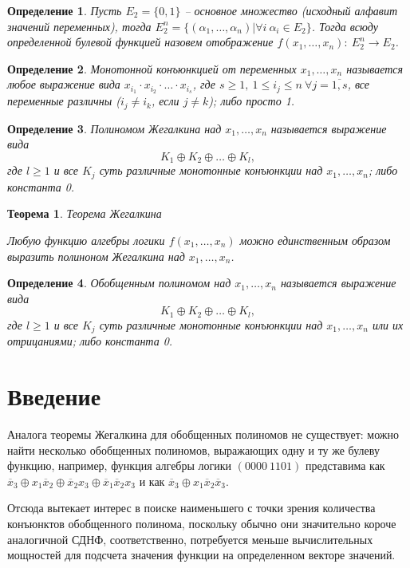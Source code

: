 \documentclass[a4paper,12pt,titlepage,finall]{article}
\newtheorem{definition}{Определение}
\newtheorem{theorem}{Теорема}
\begin{document}
\begin{definition}
    Пусть $E_2 = \{0, 1\}$ -- основное множество (исходный алфавит значений переменных), тогда $E^n_2 = \{(\alpha_1, \ldots, \alpha_n) | \forall i \  \alpha_i \in E_2\}$. Тогда всюду определенной булевой функцией назовем отображение $f(x_1, \ldots, x_n): \  E^n_2 \rightarrow E_2$.
\end{definition}
\begin{definition}
    Монотонной конъюнкцией от переменных $x_1, \ldots, x_n$ называется любое выражение вида $x_{i_1} \cdot x_{i_2} \cdot \ldots \cdot x_{i_s}$, где $s \geq 1, \  1 \leq i_j \leq n \  \forall j = \overline{1, s}$, все переменные различны ($i_j \neq i_k$, если $j \neq k$); либо просто 1.
\end{definition}
\begin{definition}
    Полиномом Жегалкина над $x_1, \ldots, x_n$ называется выражение вида
    $$K_1 \oplus K_2 \oplus \ldots \oplus K_l,$$
    где $l \geq 1$ и все $K_j$ суть различные монотонные конъюнкции над $x_1, \ldots, x_n$; либо константа 0.
\end{definition}
\begin{theorem}{Теорема Жегалкина}

    Любую функцию алгебры логики $f(x_1, \ldots, x_n)$ можно единственным образом выразить полиноном Жегалкина над $x_1, \ldots, x_n$.
\end{theorem}
\begin{definition}
    Обобщенным полиномом над $x_1, \ldots, x_n$ называется выражение вида
    $$K_1 \oplus K_2 \oplus \ldots \oplus K_l,$$
    где $l \geq 1$ и все $K_j$ суть различные монотонные конъюнкции над $x_1, \ldots, x_n$ или их отрицаниями; либо константа 0.
\end{definition}

\section{Введение}

Аналога теоремы Жегалкина для обобщенных полиномов не существует: можно найти несколько обобщенных полиномов, выражающих одну и ту же булеву функцию, например, функция алгебры логики $(0000\:1101)$ представима как $\overline x_3 \oplus x_1 \overline x_2 \oplus \overline x_2 x_3 \oplus \overline x_1 \overline x_2 x_3$ и как $\overline x_3 \oplus x_1 \overline x_2 \overline x_3$.

Отсюда вытекает интерес в поиске наименьшего с точки зрения количества конъюнктов обобщенного полинома, поскольку обычно они значительно короче аналогичной СДНФ, соответственно, потребуется меньше вычислительных мощностей для подсчета значения функции на определенном векторе значений.
\end{document}
